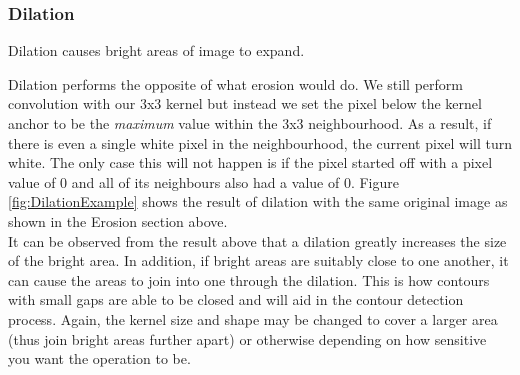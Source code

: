 \documentclass[11pt]{report}
\begin{document}
\subsubsection*{Dilation}
\begin{center}
	Dilation causes bright areas of image to expand.
\end{center}

Dilation performs the opposite of what erosion would do. We still perform 
convolution with our 3x3 kernel but instead we set the pixel below the
kernel anchor to be the \textit{maximum} value within the 3x3 neighbourhood.
As a result, if there is even a single white pixel in the neighbourhood, the
current pixel will turn white. The only case this will not happen is if the 
pixel started off with a pixel value of 0 and all of its neighbours also had
a value of 0. Figure \ref{fig:DilationExample} shows the result of dilation with
the same original image as shown in the Erosion section above. 
\\
It can be observed from the result above that a dilation greatly increases
the size of the bright area. In addition, if bright areas are suitably close
to one another, it can cause the areas to join into one through the dilation.
This is how contours with small gaps are able to be closed and will aid in the
contour detection process. Again, the kernel size and shape may be changed to
cover a larger area (thus join bright areas further apart) or otherwise 
depending on how sensitive you want the operation to be.
\end{document}
